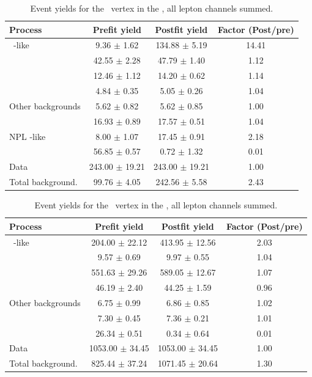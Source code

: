 \begin{table}[htbp]
	\centering
		\caption{Event yields for the \Zct\ vertex in the \TTSR,   all lepton channels summed. }
	
	\begin{tabular} {l c c c }
		\toprule
		Process & Prefit yield & Postfit yield & Factor (Post/pre) \\
		\midrule
		\NPL\ \DY-like & 9.36 $ \pm $ 1.62 & 134.88 $ \pm $ 5.19 & 14.41 \\ 
		\ttZ & 42.55 $ \pm $ 2.28 & 47.79 $ \pm $ 1.40 & 1.12 \\ 
		\WZ & 12.46 $ \pm $ 1.12 & 14.20 $ \pm $ 0.62 & 1.14 \\ 
		\ZZ & 4.84 $ \pm $ 0.35 & 5.05 $ \pm $ 0.26 & 1.04 \\ 
		Other backgrounds & 5.62 $ \pm $ 0.82 & 5.62 $ \pm $ 0.85 & 1.00 \\ 
		\tZq & 16.93 $ \pm $ 0.89 & 17.57 $ \pm $ 0.51 & 1.04 \\ 
		NPL \ttbar-like & 8.00 $ \pm $ 1.07 & 17.45 $ \pm $ 0.91 & 2.18\\
		\kZct  & 56.85 $ \pm $ 0.57 & 0.72 $ \pm $ 1.32 & 0.01 \B\\
		\hdashline
		Data & 243.00 $ \pm $ 19.21 & 243.00 $ \pm $ 19.21 & 1.00 \T \\
		Total background. & 99.76 $ \pm $ 4.05 & 242.56 $ \pm $ 5.58 & 2.43\\
		\bottomrule
	\end{tabular}
\end{table}
\begin{table}[htbp]
	\centering
		\caption{Event yields for the \Zct\ vertex in the \WZCR,  all lepton channels summed. }
	
	\begin{tabular} {l c c c }
		\toprule
		Process & Prefit yield & Postfit yield & Factor (Post/pre) \\
		\midrule
		\NPL\ \DY-like & 204.00 $ \pm $ 22.12 & 413.95 $ \pm $ 12.56 & 2.03 \\ 
		\ttZ & 9.57 $ \pm $ 0.69 & 9.97 $ \pm $ 0.55 & 1.04 \\ 
		\WZ & 551.63 $ \pm $ 29.26 & 589.05 $ \pm $ 12.67 & 1.07 \\ 
		\ZZ & 46.19 $ \pm $ 2.40 & 44.25 $ \pm $ 1.59 & 0.96 \\ 
		Other backgrounds & 6.75 $ \pm $ 0.99 & 6.86 $ \pm $ 0.85 & 1.02 \\ 
		\tZq & 7.30 $ \pm $ 0.45 & 7.36 $ \pm $ 0.21 & 1.01 \\ 
		\kZct  & 26.34 $ \pm $ 0.51 & 0.34 $ \pm $ 0.64 & 0.01\\
		\hdashline
		Data & 1053.00 $ \pm $ 34.45 & 1053.00 $ \pm $ 34.45 & 1.00\\
		Total background. & 825.44 $ \pm $ 37.24 & 1071.45 $ \pm $ 20.64 & 1.30\\
		\bottomrule
	\end{tabular}
\end{table}
